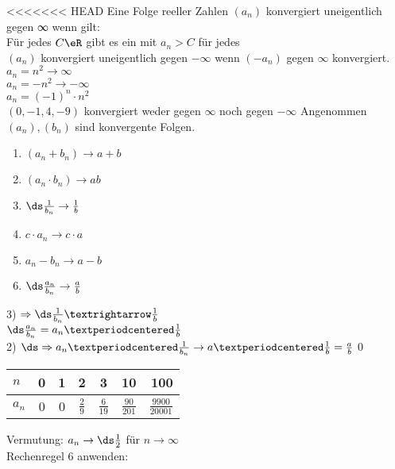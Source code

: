 <<<<<<< HEAD
%
%
\wdh
Eine Folge reeller Zahlen $(a_n)$ konvergiert uneigentlich gegen ∞ wenn gilt:\\
Für jedes $C\eR$ gibt es ein \nN{} mit $a_n > C$ für jedes \nN\\[4pt]
$(a_n)$ konvergiert uneigentlich gegen $- ∞$ wenn $(-a_n)$ gegen $∞$ konvergiert.\\
%
%
\bsp
$a_n = n^2 \to ∞$\\
$a_n = -n^2 \to -∞$\\
$a_n = (-1)^n · n^2$\\
$(0, -1, 4, -9)$ konvergiert weder gegen $∞$ noch gegen $ - ∞$
%
Angenommen $(a_n), (b_n)$ sind konvergente Folgen.\\
\begin{enumerate}
\item{$(a_n + b_n) \to a + b$}
\item{$(a_n · b_n) \to ab$}
\item{$\ds\frac{1}{b_n} \to \frac{1}{b}$}
\item{$c · a_n \to c · a$}
\item{$a_n - b_n \to a - b$}
\item{$\ds\frac{a_n}{b_n} \to \frac{a}{b}$}
\end{enumerate}
%
3) $\Rightarrow\ds\frac{1}{b_n}→\frac{1}{b}$\\
$\ds\frac{a_n}{b_n} = a_n ·\frac{1}{b}$\\
2) $\ds\Rightarrow a_n · \frac{1}{b_n} \to a ·\frac{1}{b} = \frac{a}{b}$\qed
%
\bsp
\begin{tabular}{l|c|c|c|c|c|r}
$n$   & 0 & 1 & 2 & 3 & 10 & 100\\\hline
$a_n$ & 0 & 0 & $\frac{2}{9}$ & $\frac{6}{19}$ & $\frac{90}{201}$ & $\frac{9900}{20001}$ \\
\end{tabular}
\vspace{5mm}
Vermutung: $a_n \to \ds\frac{1}{2}$ für $n \to ∞$\\
Rechenregel 6 anwenden:\\
